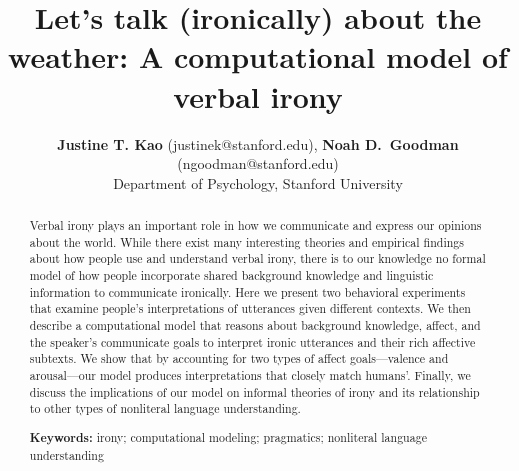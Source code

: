 \documentclass[10pt,letterpaper]{article}
\title{Let's talk (ironically) about the weather: A computational model of verbal irony}
\author{{\large {\bf Justine T. Kao} (justinek@stanford.edu)}, {\large {\bf Noah D.~Goodman} (ngoodman@stanford.edu)}\\
  Department of Psychology, Stanford University}
\begin{document}
\maketitle


\begin{abstract}
Verbal irony plays an important role in how we communicate and express our opinions about the world. While there exist many interesting theories and empirical findings about how people use and understand verbal irony, there is to our knowledge no formal model of how people incorporate shared background knowledge and linguistic information to communicate ironically. Here we present two behavioral experiments that examine people's interpretations of utterances given different contexts. We then describe a computational model that reasons about background knowledge, affect, and the speaker's communicate goals to interpret ironic utterances and their rich affective subtexts. We show that by accounting for two types of affect goals---valence and arousal---our model produces interpretations that closely match humans'. Finally, we discuss the implications of our model on informal theories of irony and its relationship to other types of nonliteral language understanding.


\textbf{Keywords:} 
irony; computational modeling; pragmatics; nonliteral language understanding
\end{abstract}
\end{document}
